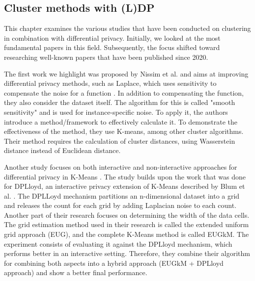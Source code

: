 \subsection{Cluster methods with (L)DP}
This chapter examines the various studies that have been conducted on clustering in combination with differential privacy.
Initially, we looked at the most fundamental papers in this field. Subsequently, the focus shifted toward researching well-known papers that have been published since 2020.

The first work we highlight was proposed by Nissim et al. and aims at improving differential privacy methods, such as Laplace, which uses sensitivity to compensate the noise for a function \citep{nissim_smooth_2007}.
In addition to compensating the function, they also consider the dataset itself.
The algorithm for this is called "smooth sensitivity" and is used for instance-specific noise.
To apply it, the authors introduce a method/framework to effectively calculate it.
To demonstrate the effectiveness of the method, they use K-means, among other cluster algorithms.
Their method requires the calculation of cluster distances, using Wasserstein distance instead of Euclidean distance.

Another study focuses on both interactive and non-interactive approaches for differential privacy in K-Means \citep{su_differentially_2015-1}.
The study builds upon the work that was done for DPLloyd, an interactive privacy extension of K-Means described by Blum et al. \citep{blum_practical_2005}.
The DPLLoyd mechanism partitions an n-dimensional dataset into a grid and releases the count for each grid by adding Laplacian noise to each count.
Another part of their research focuses on determining the width of the data cells.
The grid estimation method used in their research is called the extended uniform grid approach (EUG), and the complete K-Means method is called EUGkM.
The experiment consists of evaluating it against the DPLloyd mechanism, which performs better in an interactive setting.
Therefore, they combine their algorithm for combining both aspects into a hybrid approach (EUGkM + DPLloyd approach) and show a better final performance.

